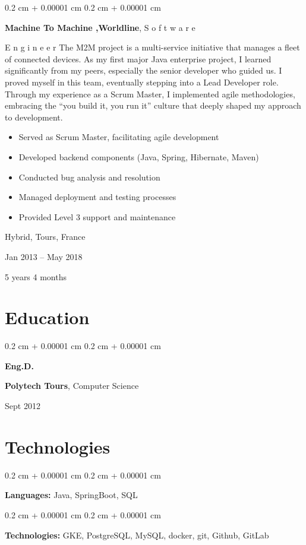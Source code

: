 \documentclass[10pt, letterpaper]{article}
\newenvironment{highlights}{
    \begin{itemize}[
        topsep=0.10 cm,
        parsep=0.10 cm,
        partopsep=0pt,
        itemsep=0pt,
        leftmargin=0.4 cm + 10pt
    ]
}{
    \end{itemize}
} %
\newenvironment{onecolentry}{
    \begin{adjustwidth}{
        0.2 cm + 0.00001 cm
    }{
        0.2 cm + 0.00001 cm
    }
}{
    \end{adjustwidth}
} %
\newenvironment{twocolentry}[2][]{
    \onecolentry
    \def\secondColumn{#2}
    \setcolumnwidth{\fill, 4.5 cm}
    \begin{paracol}{2}
}{
    \switchcolumn \raggedleft \secondColumn
    \end{paracol}
    \endonecolentry
} %
\newenvironment{threecolentry}[3][]{
    \onecolentry
    \def\thirdColumn{#3}
    \setcolumnwidth{1 cm, \fill, 4.5 cm}
    \begin{paracol}{3}
    {\raggedright #2} \switchcolumn
}{
    \switchcolumn \raggedleft \thirdColumn
    \end{paracol}
    \endonecolentry
} %
\begin{document}
        \begin{twocolentry}{
            Hybrid, Tours, France

        Jan 2013 – May 2018

        5 years 4 months
        }
            \textbf{Machine To Machine ,Worldline}, S
        o
        f
        t
        w
        a
        r
        e
         
        E
        n
        g
        i
        n
        e
        e
        r 
            The M2M project is a multi-service initiative that manages a fleet of connected devices. As my first major Java enterprise project, I learned significantly from my peers, especially the senior developer who guided us. I proved myself in this team, eventually stepping into a Lead Developer role. Through my experience as a Scrum Master, I implemented agile methodologies, embracing the “you build it, you run it” culture that deeply shaped my approach to development.
            \begin{highlights}
                \item Served as Scrum Master, facilitating agile development
                \item Developed backend components (Java, Spring, Hibernate, Maven)
                \item Conducted bug analysis and resolution
                \item Managed deployment and testing processes
                \item Provided Level 3 support and maintenance
            \end{highlights}
        \end{twocolentry}



    
    \section{Education}



        
        \begin{threecolentry}{\textbf{Eng.D.}}{
            Sept 2012
        }
            \textbf{Polytech Tours}, Computer Science
        \end{threecolentry}


    
    \section{Technologies}



        
        \begin{onecolentry}
            \textbf{Languages:} Java, SpringBoot, SQL
        \end{onecolentry}

        \vspace{0.2 cm}

        \begin{onecolentry}
            \textbf{Technologies:} GKE, PostgreSQL, MySQL, docker, git, Github, GitLab
        \end{onecolentry}


    
\end{document}

